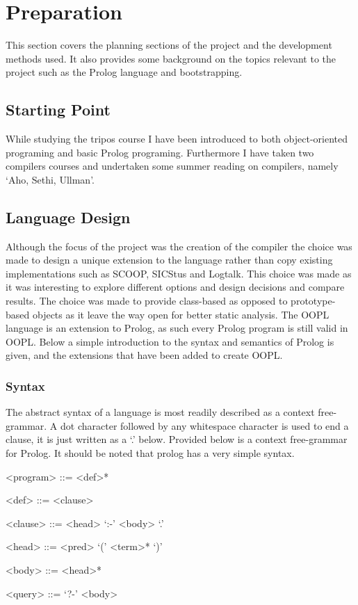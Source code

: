 \documentclass[12pt,a4paper,twoside,openright]{report}
\begin{document}
\chapter{Preparation}

This section covers the planning sections of the project and the development methods used. It also provides some background on the topics relevant to the project such as the Prolog language and bootstrapping.

\section{Starting Point}

While studying the tripos course I have been introduced to both object-oriented programing and basic Prolog programing. Furthermore I have taken two compilers courses and undertaken some summer reading on compilers, namely `Aho, Sethi, Ullman'\cite{DRAGON}.

\section {Language Design}

Although the focus of the project was the creation of the compiler the choice was made to design a unique extension to the language rather than copy existing implementations such as SCOOP, SICStus and Logtalk. This choice was made as it was interesting to explore different options and design decisions and compare results. The choice was made to provide class-based as opposed to prototype-based objects as it leave the way open for better static analysis. The OOPL language is an extension to Prolog, as such every Prolog program is still valid in OOPL. Below a simple introduction to the syntax and semantics of Prolog is given, and the extensions that have been added to create OOPL.

\subsection {Syntax}

The abstract syntax of a language is most readily described as a context free-grammar. A dot character followed by any whitespace character is used to end a clause, it is just written as a `.' below. Provided below is a context free-grammar for Prolog. It should be noted that prolog has a very simple syntax.

\begin{grammar}

<program> ::= <def>*
		
<def> ::= <clause>
		
<clause> ::= <head> `:-' <body> `.'
		
<head> 	::= <pred> `(' <term>* `)'
		
<body> ::= <head>*

<query> ::= `?-' <body>

\end{grammar}		
\end{document}
